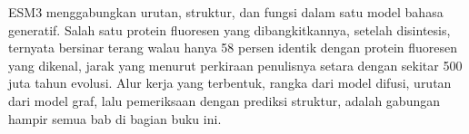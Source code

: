 ESM3 \citep{hayes2025} menggabungkan urutan, struktur, dan fungsi dalam satu model bahasa generatif. Salah satu protein
fluoresen yang dibangkitkannya, setelah disintesis, ternyata bersinar terang walau hanya 58 persen identik dengan protein
fluoresen yang dikenal, jarak yang menurut perkiraan penulisnya setara dengan sekitar 500 juta tahun evolusi. Alur kerja
yang terbentuk, rangka dari model difusi, urutan dari model graf, lalu pemeriksaan dengan prediksi struktur, adalah
gabungan hampir semua bab di bagian buku ini.


